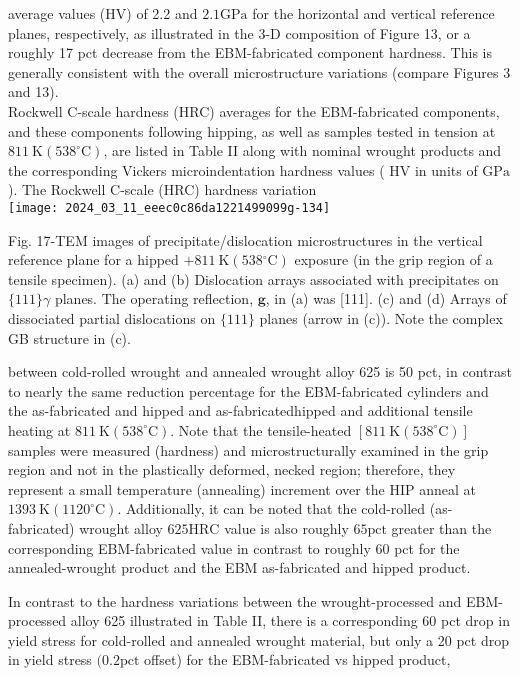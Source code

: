 \documentclass[10pt]{article}
\begin{document}
average values (HV) of 2.2 and $2.1 \mathrm{GPa}$ for the horizontal and vertical reference planes, respectively, as illustrated in the 3-D composition of Figure 13, or a roughly 17 pct decrease from the EBM-fabricated component hardness. This is generally consistent with the overall microstructure variations (compare Figures 3 and 13).\\
Rockwell C-scale hardness (HRC) averages for the EBM-fabricated components, and these components following hipping, as well as samples tested in tension at $811 \mathrm{~K}\left(538^{\circ} \mathrm{C}\right)$, are listed in Table II along with nominal wrought products and the corresponding Vickers microindentation hardness values ( $\mathrm{HV}$ in units of $\mathrm{GPa}$ ). The Rockwell C-scale (HRC) hardness variation\\
\texttt{[image: 2024\_03\_11\_eeec0c86da1221499099g-134]}

Fig. 17-TEM images of precipitate/dislocation microstructures in the vertical reference plane for a hipped $+811 \mathrm{~K}\left(538{ }^{\circ} \mathrm{C}\right)$ exposure (in the grip region of a tensile specimen). (a) and (b) Dislocation arrays associated with precipitates on $\{111\} \gamma$ planes. The operating reflection, $\mathbf{g}$, in (a) was [111]. (c) and (d) Arrays of dissociated partial dislocations on $\{111\}$ planes (arrow in (c)). Note the complex GB structure in (c).

between cold-rolled wrought and annealed wrought alloy 625 is 50 pct, in contrast to nearly the same reduction percentage for the EBM-fabricated cylinders and the as-fabricated and hipped and as-fabricatedhipped and additional tensile heating at $811 \mathrm{~K}\left(538^{\circ} \mathrm{C}\right)$. Note that the tensile-heated $\left[811 \mathrm{~K}\left(538^{\circ} \mathrm{C}\right)\right]$ samples were measured (hardness) and microstructurally examined in the grip region and not in the plastically deformed, necked region; therefore, they represent a small temperature (annealing) increment over the HIP anneal at $1393 \mathrm{~K}\left(1120^{\circ} \mathrm{C}\right)$. Additionally, it can be noted that the cold-rolled (as-fabricated) wrought alloy $625 \mathrm{HRC}$ value is also roughly $65 \mathrm{pct}$ greater than the corresponding EBM-fabricated value in contrast to roughly 60 pct for the annealed-wrought product and the EBM as-fabricated and hipped product.

In contrast to the hardness variations between the wrought-processed and EBM-processed alloy 625 illustrated in Table II, there is a corresponding 60 pct drop in yield stress for cold-rolled and annealed wrought material, but only a 20 pct drop in yield stress $(0.2 \mathrm{pct}$ offset) for the EBM-fabricated vs hipped product,
\end{document}
